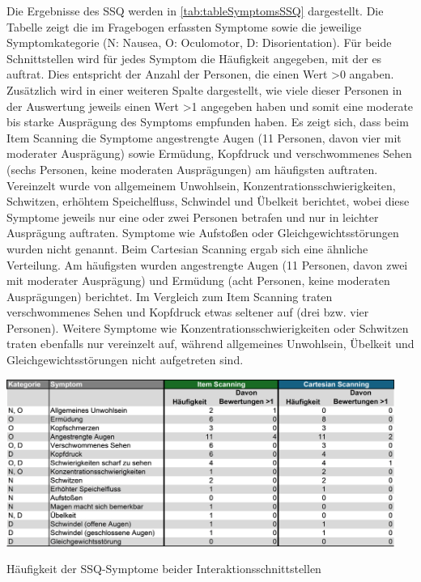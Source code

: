 Die Ergebnisse des SSQ werden in \autoref{tab:tableSymptomsSSQ} dargestellt. Die Tabelle zeigt die im Fragebogen erfassten Symptome sowie die jeweilige Symptomkategorie (N: Nausea, O: Oculomotor, D: Disorientation). Für beide Schnittstellen wird für jedes Symptom die Häufigkeit angegeben, mit der es auftrat. Dies entspricht der Anzahl der Personen, die einen Wert >0 angaben. Zusätzlich wird in einer weiteren Spalte dargestellt, wie viele dieser Personen in der Auswertung jeweils einen Wert >1 angegeben haben und somit eine moderate bis starke Ausprägung des Symptoms empfunden haben. 
Es zeigt sich, dass beim Item Scanning die Symptome angestrengte Augen (11 Personen, davon vier mit moderater Ausprägung) sowie Ermüdung, Kopfdruck und verschwommenes Sehen (sechs Personen, keine moderaten Ausprägungen) am häufigsten auftraten. Vereinzelt wurde von allgemeinem Unwohlsein, Konzentrationsschwierigkeiten, Schwitzen, erhöhtem Speichelfluss, Schwindel und Übelkeit berichtet, wobei diese Symptome jeweils nur eine oder zwei Personen betrafen und nur in leichter Ausprägung auftraten. Symptome wie Aufstoßen oder Gleichgewichtsstörungen wurden nicht genannt.
Beim Cartesian Scanning ergab sich eine ähnliche Verteilung. Am häufigsten wurden angestrengte Augen (11 Personen, davon zwei mit moderater Ausprägung) und Ermüdung (acht Personen, keine moderaten Ausprägungen) berichtet. Im Vergleich zum Item Scanning traten verschwommenes Sehen und Kopfdruck etwas seltener auf (drei bzw. vier Personen). Weitere Symptome wie Konzentrationsschwierigkeiten oder Schwitzen traten ebenfalls nur vereinzelt auf, während allgemeines Unwohlsein, Übelkeit und Gleichgewichtsstörungen nicht aufgetreten sind.

\begin{table}[tbh]
    \centering
    \includegraphics[width=0.95\textwidth]{images/Results/SSQ-Table-2.png}
    \caption{Häufigkeit der SSQ-Symptome beider Interaktionsschnittstellen}
    \label{tab:tableSymptomsSSQ}
\end{table}

